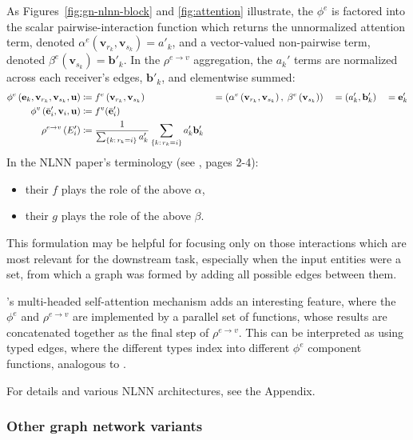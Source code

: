 As Figures~\ref{fig:gn-nlnn-block} and \ref{fig:attention} illustrate, the $\phi^e$ is factored into the scalar pairwise-interaction function which returns the unnormalized attention term, denoted  $\alpha^e\left(\mathbf{v}_{r_k}, \mathbf{v}_{s_k}\right) = a'_k$, and a vector-valued non-pairwise term, denoted $\beta^e\left(\mathbf{v}_{s_k}\right) = \mathbf{b}'_k$. In the $\rho^{e\rightarrow v}$ aggregation, the $a_k'$ terms are normalized across each receiver's edges, $\mathbf{b}'_k$, and elementwise summed:
\begin{alignat*}{4}
\phi^e\left(\mathbf{e}_k, \mathbf{v}_{r_k}, \mathbf{v}_{s_k}, \globals\right) &\coloneqq f^e\left(\mathbf{v}_{r_k}, \mathbf{v}_{s_k}\right) &&= \left( \alpha^e\left(\mathbf{v}_{r_k}, \mathbf{v}_{s_k}\right), \; \beta^e\left(\mathbf{v}_{s_k}\right) \right) &&= (a'_k, \mathbf{b}'_k) &&= \mathbf{e}'_k \\
%
\phi^v\left(\bar{\mathbf{e}}'_i, \mathbf{v}_i, \globals\right) &\coloneqq f^v(\bar{\mathbf{e}}'_i) \\
%
\rho^{e\rightarrow v}\left( E'_i \right) &\coloneqq \frac{1}{\sum_{\{k:\, r_k = i\}} a'_k} \sum_{\{k:\, r_k=i\}} a'_k \mathbf{b}'_k
\end{alignat*}
In the NLNN paper's terminology (see \cite{wang2017non}, pages 2-4):
\begin{itemize}[noitemsep]
\item their $f$ plays the role of the above $\alpha$,
\item their $g$ plays the role of the above $\beta$.
\end{itemize}
This formulation may be helpful for focusing only on those interactions which are most relevant for the downstream task, especially when the input entities were a set, from which a graph was formed by adding all possible edges between them.

\cite{vaswani2017attention}'s multi-headed self-attention mechanism adds an interesting feature, where the $\phi^e$ and $\rho^{e\rightarrow v}$ are implemented by a parallel set of functions, whose results are concatenated together as the final step of $\rho^{e\rightarrow v}$. This can be interpreted as using typed edges, where the different types index into different $\phi^e$ component functions, analogous to \cite{li2015gated}.

For details and various NLNN architectures, see the Appendix.


\subsubsection{Other graph network variants}
\label{sec:other-variants}

